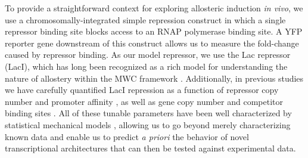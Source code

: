   To provide a straightforward context for exploring allosteric induction
\textit{in vivo}, we use a chromosomally-integrated simple repression construct
in which a single repressor binding site blocks access to an RNAP polymerase
binding site. A YFP reporter gene downstream of this construct allows us to
measure the fold-change caused by repressor binding. As our model repressor, we
use the Lac repressor (LacI), which has long been recognized as a rich model
for understanding the nature of allostery within the MWC framework
\cite{Daly1986, Dunaway1980, Meyer2013, Daber2007, Daber2009,
	Muller-Hartmann1996, OGorman1980, Sharp2011, Taraban2008, Wilson2007}.
Additionally, in previous studies we have carefully quantified LacI repression
as a function of repressor copy number and promoter affinity \cite{Garcia2011},
as well as gene copy number and competitor binding sites \cite{Weinert2014}. All
of these tunable parameters have been well characterized by statistical
mechanical models \cite{Bintu2005a, Bintu2005b}, allowing us to go beyond merely
characterizing known data and enable us to predict \textit{a priori} the
behavior of novel transcriptional architectures that can then be tested against
experimental data. 

